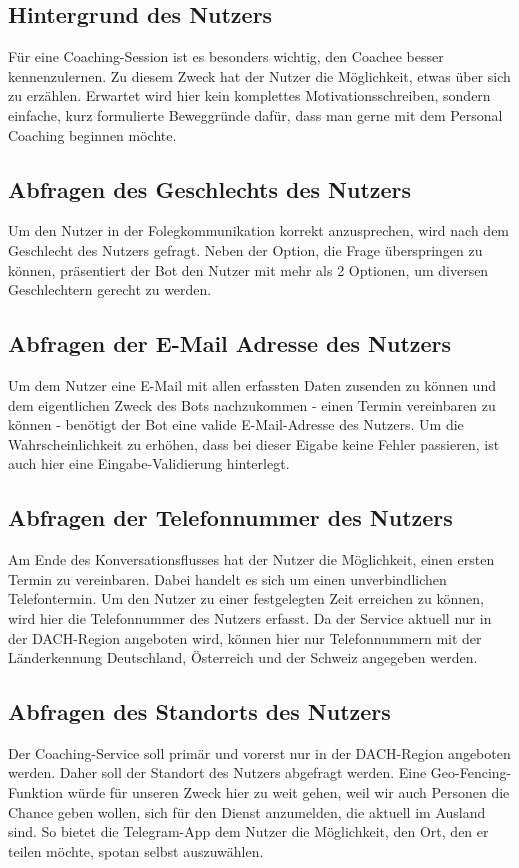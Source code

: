         \subsection{Hintergrund des Nutzers}
        Für eine Coaching-Session ist es besonders wichtig, den Coachee besser kennenzulernen. Zu diesem Zweck hat der Nutzer die Möglichkeit, etwas über sich zu erzählen. Erwartet wird hier kein komplettes Motivationsschreiben, sondern einfache, kurz formulierte Beweggründe dafür, dass man gerne mit dem Personal Coaching beginnen möchte. 
        
        \subsection{Abfragen des Geschlechts des Nutzers}
        Um den Nutzer in der Folegkommunikation korrekt anzusprechen, wird nach dem Geschlecht des Nutzers gefragt. Neben der Option, die Frage überspringen zu können, präsentiert der Bot den Nutzer mit mehr als 2 Optionen, um diversen Geschlechtern gerecht zu werden.
        
        \subsection{Abfragen der E-Mail Adresse des Nutzers}
        Um dem Nutzer eine E-Mail mit allen erfassten Daten zusenden zu können und dem eigentlichen Zweck des Bots nachzukommen - einen Termin vereinbaren zu können - benötigt der Bot eine valide E-Mail-Adresse des Nutzers. Um die Wahrscheinlichkeit zu erhöhen, dass bei dieser Eigabe keine Fehler passieren, ist auch hier eine Eingabe-Validierung hinterlegt.
        
        \subsection{Abfragen der Telefonnummer des Nutzers}
        Am Ende des Konversationsflusses hat der Nutzer die Möglichkeit, einen ersten Termin zu vereinbaren. Dabei handelt es sich um einen unverbindlichen Telefontermin. Um den Nutzer zu einer festgelegten Zeit erreichen zu können, wird hier die Telefonnummer des Nutzers erfasst. Da der Service aktuell nur in der DACH-Region angeboten wird, können hier nur Telefonnummern mit der Länderkennung Deutschland, Österreich und der Schweiz angegeben werden. 
        
        \subsection{Abfragen des Standorts des Nutzers}
        Der Coaching-Service soll primär und vorerst nur in der DACH-Region angeboten werden. Daher soll der Standort des Nutzers abgefragt werden. Eine Geo-Fencing-Funktion würde für unseren Zweck hier zu weit gehen, weil wir auch Personen die Chance geben wollen, sich für den Dienst anzumelden, die aktuell im Ausland sind. So bietet die Telegram-App dem Nutzer die Möglichkeit, den Ort, den er teilen möchte, spotan selbst auszuwählen.
        
